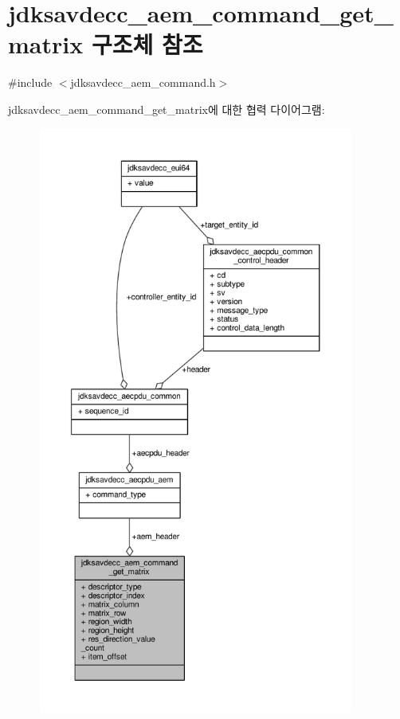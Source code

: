 \hypertarget{structjdksavdecc__aem__command__get__matrix}{}\section{jdksavdecc\+\_\+aem\+\_\+command\+\_\+get\+\_\+matrix 구조체 참조}
\label{structjdksavdecc__aem__command__get__matrix}


{\ttfamily \#include $<$jdksavdecc\+\_\+aem\+\_\+command.\+h$>$}



jdksavdecc\+\_\+aem\+\_\+command\+\_\+get\+\_\+matrix에 대한 협력 다이어그램\+:
\nopagebreak
\begin{figure}[H]
\begin{center}
\leavevmode
\includegraphics[height=550pt]{structjdksavdecc__aem__command__get__matrix__coll__graph}
\end{center}
\end{figure}
